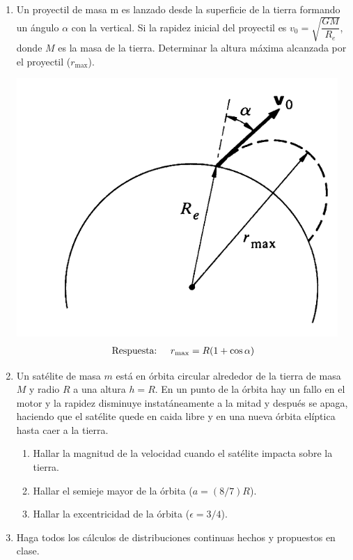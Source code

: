 \documentclass[11pt,twocolumn]{article}
\begin{document}
\begin{enumerate}
\item Un proyectil de masa m es lanzado desde la superficie de la tierra formando un  ángulo $\alpha$ con la vertical. Si la rapidez inicial del proyectil es $v_0=\sqrt{\dfrac{GM}{R_e}}$, donde $M$ es la masa de la tierra. Determinar la altura máxima alcanzada por el proyectil ($r_{\text{max}}$).

\includegraphics[scale=0.3]{tiro}
\begin{align*}
\text{Respuesta:}\hspace{0.5 cm} r_{\text{max}}=R(1+\cos\alpha)
\end{align*}

\item Un satélite de masa $m$ está en órbita circular alrededor de la tierra de masa $M$ y radio $R$ a una altura $h=R$. En un punto de la órbita hay un fallo en el motor y la rapidez disminuye instatáneamente a la mitad y después se apaga, haciendo que el satélite quede en caida libre y en una nueva órbita elíptica hasta caer a la tierra.
\begin{enumerate}
\item Hallar la magnitud de la velocidad cuando el satélite impacta sobre la tierra.
\item Hallar el semieje mayor de la órbita ($a=(8/7)R$).
\item Hallar la excentricidad de la órbita ($\epsilon=3/4$).
\end{enumerate}

\item Haga todos los cálculos de distribuciones continuas hechos y propuestos en clase.


\end{enumerate}
\end{document}
